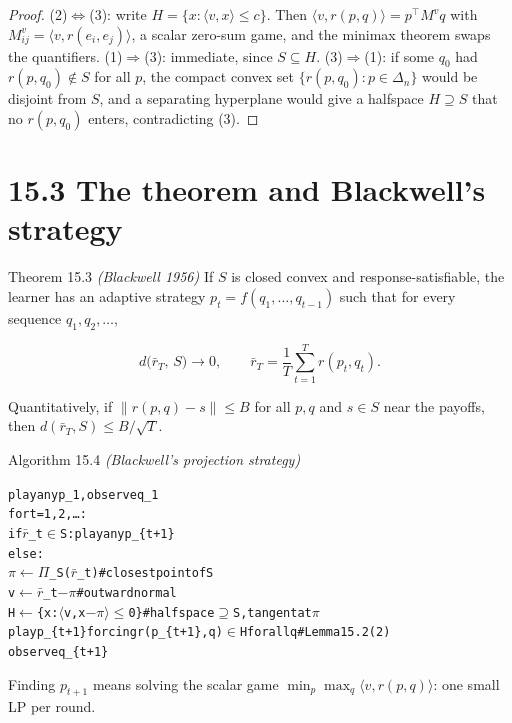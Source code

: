\documentclass[11pt,a4paper,openany]{book}
\newcommand{\ip}[2]{\langle #1,#2\rangle}
\newcommand{\norm}[1]{\lVert #1\rVert}
\newcommand{\simplex}{\Delta}
\newenvironment{algo}{\par\smallskip\begingroup\footnotesize\begin{alltt}}{\end{alltt}\endgroup\smallskip}
\begin{document}
\begin{proof}
(2)\ensuremath{\Leftrightarrow}(3): write $H=\{x:\ip{v}{x}\le c\}$. Then $\ip{v}{r(p,q)}=p^\top M^vq$ with $M^v_{ij}=\ip{v}{r(e_i,e_j)}$, a scalar zero-sum game, and the minimax theorem swaps the quantifiers.
(1)\ensuremath{\Rightarrow}(3): immediate, since $S\subseteq H$.
(3)\ensuremath{\Rightarrow}(1): if some $q_0$ had $r(p,q_0)\notin S$ for all $p$, the compact convex set $\{r(p,q_0):p\in\simplex_n\}$ would be disjoint from $S$, and a separating hyperplane would give a halfspace $H\supseteq S$ that no $r(p,q_0)$ enters, contradicting (3).
\end{proof}

\section*{15.3 The theorem and Blackwell's strategy}\label{ch15-bat}

\begin{bthm}{Theorem 15.3 \emph{(Blackwell 1956)}}
If $S$ is closed convex and response-satisfiable, the learner has an adaptive strategy $p_t=f(q_1,\dots,q_{t-1})$ such that for every sequence $q_1,q_2,\dots$,

\[d\Big(\bar r_T,\,S\Big)\to0,\qquad \bar r_T=\frac1T\sum_{t=1}^Tr(p_t,q_t).\]

Quantitatively, if $\norm{r(p,q)-s}\le B$ for all $p,q$ and $s\in S$ near the payoffs, then $d(\bar r_T,S)\le B/\sqrt T$.
\end{bthm}

\begin{balg}{Algorithm 15.4 \emph{(Blackwell's projection strategy)}}
\begin{algo}
play any p\_1, observe q\_1
for t = 1, 2, …:
    if  \ensuremath{\bar{r}}\_t \ensuremath{\in} S:  play any p\_\{t+1\}
    else:
        \ensuremath{\pi} \ensuremath{\leftarrow} \ensuremath{\Pi}\_S(\ensuremath{\bar{r}}\_t)                               \# closest point of S
        v \ensuremath{\leftarrow} \ensuremath{\bar{r}}\_t \ensuremath{-} \ensuremath{\pi}                                 \# outward normal
        H \ensuremath{\leftarrow} \{ x : \ensuremath{\langle}v, x \ensuremath{-} \ensuremath{\pi}\ensuremath{\rangle} \ensuremath{\le} 0 \}                  \# halfspace \ensuremath{\supseteq} S, tangent at \ensuremath{\pi}
        play p\_\{t+1\} forcing r(p\_\{t+1\}, q) \ensuremath{\in} H for all q   \# Lemma 15.2 (2)
    observe q\_\{t+1\}
\end{algo}

Finding $p_{t+1}$ means solving the scalar game $\min_p\max_q\ip{v}{r(p,q)}$: one small LP per round.
\end{balg}
\end{document}
